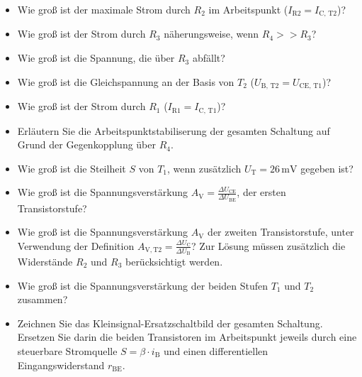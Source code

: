 {      \begin{itemize}
            \item[a)]
                  Wie groß ist der maximale Strom durch $R_2$ im Arbeitspunkt ($I_\mathrm{R2}=I_\mathrm{C,\,T2}$)?
            \item[b)]
                  Wie groß ist der Strom durch $R_3$ näherungsweise, wenn $R_4 >> R_3$?
            \item[c)]
                  Wie groß ist die Spannung, die über $R_3$ abfällt?
            \item[d)]
                  Wie groß ist die Gleichspannung an der Basis von $T_2$ ($U_\mathrm{B,\,T2}=U_\mathrm{CE,\,T1}$)?
            \item[e)]
                  Wie groß ist der Strom durch $R_1$ ($I_\mathrm{R1}=I_\mathrm{C,\,T1}$)?
            \item[f)]
                  Erläutern Sie die Arbeitspunktstabiliserung der gesamten Schaltung auf Grund der Gegenkopplung über $R_4$.
            \item[g)]
                  Wie groß ist die Steilheit $S$ von $T_\mathrm{1}$, wenn zusätzlich $U_\mathrm{T} = 26\, \mathrm{mV}$ gegeben ist?
            \item[h)]
                  Wie groß ist die Spannungsverstärkung $A_\mathrm{V} = \frac{\Delta U_\mathrm{CE}}{\Delta U_\mathrm{BE}}$, der ersten Transistorstufe?
            \item[i)]
                  Wie groß ist die Spannungsverstärkung $A_\mathrm{V}$ der zweiten Transistorstufe, unter Verwendung der Definition $A_\mathrm{V,T2}=\frac{\Delta U_\mathrm{C}}{\Delta U_\mathrm{B}}$?
                  Zur Lösung müssen zusätzlich die Widerstände $R_2$ und $R_3$ berücksichtigt werden.
            \item[j)]
                  Wie groß ist die Spannungsverstärkung der beiden Stufen $T_\mathrm{1}$ und $T_\mathrm{2}$ zusammen?
            \item[k)]
                  Zeichnen Sie das Kleinsignal-Ersatzschaltbild der gesamten Schaltung. Ersetzen Sie darin die beiden Transistoren im Arbeitspunkt jeweils durch eine steuerbare Stromquelle $S=\beta\cdot i_\mathrm{B}$ und einen differentiellen Eingangswiderstand $r_\mathrm{BE}$.
      \end{itemize}
}


